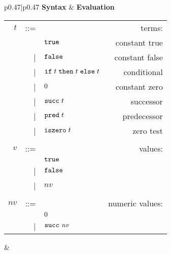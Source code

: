 \begin{figure*}[h]
\footnotesize
\begin{tabular}{p{}|p{}}
    \textbf{Syntax} & \textbf{Evaluation} \tabularnewline[1em]
    \begin{tabular}{r@{\hspace{0.5em}}r@{\hspace{0.5em}}l@{\hspace{0.5em}}r}

              $t$ & ::= &                       & terms:          \\
                  &     & $\texttt{true}$               & constant true   \\
                  & |   & $\texttt{false}$              & constant false  \\
                  & |   & $\texttt{if\;}t\texttt{\;then\;}t\texttt{\;else\;}t$       & conditional     \\
                  & |   & $0$               & constant zero   \\
                  & |   & $\texttt{succ\;}t$           & successor       \\
                  & |   & $\texttt{pred\;}t$           & predecessor     \\
                  & |   & $\texttt{iszero\;}t$         & zero test       \\
                  &     &                       &                 \\
              $v$ & ::= &                       & values:         \\
                  &     & $\texttt{true}$               &                 \\
                  & |   & $\texttt{false}$              &                 \\
                  & |   & $\mathit{nv}$         &                 \\
                  &     &                       &                 \\
    $\mathit{nv}$ & ::= &                       & numeric values: \\
                  &     & $0$               &                 \\
                  & |   & $\texttt{succ\;}\mathit{nv}$ &                 \\
    \end{tabular}
&
    \renewcommand{\arraystretch}{2.5}
\end{tabular}
\end{figure*}
